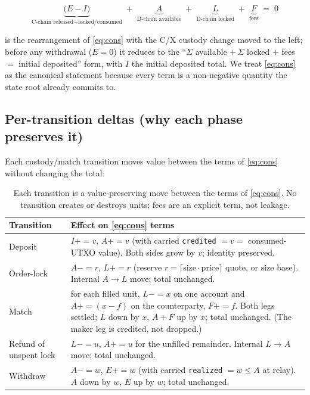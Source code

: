 \[
\underbrace{\big(E - I\big)}_{\text{C-chain released} - \text{locked/consumed}}
\;+\; \underbrace{A}_{\text{D-chain available}}
\;+\; \underbrace{L}_{\text{D-chain locked}}
\;+\; \underbrace{F}_{\text{fees}} \;=\; 0
\]

is the rearrangement of \eqref{eq:cons} with the C/X custody change
moved to the left; before any withdrawal ($E = 0$) it reduces to the
``$\Sigma$ available $+\,\Sigma$ locked $+$ fees $=$ initial deposited''
form, with $I$ the initial deposited total. We treat \eqref{eq:cons} as
the canonical statement because every term is a non-negative quantity
the state root already commits to.

\subsection{Per-transition deltas (why each phase preserves it)}

Each custody/match transition moves value between the terms of
\eqref{eq:cons} without changing the total:

\begin{table}[h]
\centering
\small
\begin{tabular}{@{}lp{8.5cm}@{}}
\toprule
\textbf{Transition} & \textbf{Effect on \eqref{eq:cons} terms} \\
\midrule
Deposit & $I \mathbin{+}= v$, $A \mathbin{+}= v$ (with carried
  \texttt{credited} $= v =$ consumed-UTXO value). Both sides grow by
  $v$; identity preserved. \\
Order-lock & $A \mathbin{-}= r$, $L \mathbin{+}= r$ (reserve $r =
  \lceil \mathrm{size}\cdot\mathrm{price}\rceil$ quote, or $\mathrm{size}$
  base). Internal $A\!\to\!L$ move; total unchanged. \\
Match & for each filled unit, $L \mathbin{-}= x$ on one account and
  $A \mathbin{+}= (x-f)$ on the counterparty, $F \mathbin{+}= f$. Both
  legs settled; $L$ down by $x$, $A{+}F$ up by $x$; total unchanged.
  (The maker leg is credited, not dropped.) \\
Refund of unspent lock & $L \mathbin{-}= u$, $A \mathbin{+}= u$ for the
  unfilled remainder. Internal $L\!\to\!A$ move; total unchanged. \\
Withdraw & $A \mathbin{-}= w$, $E \mathbin{+}= w$ (with carried
  \texttt{realized} $= w \le A$ at relay). $A$ down by $w$, $E$ up by
  $w$; total unchanged. \\
\bottomrule
\end{tabular}
\caption{Each transition is a value-preserving move between the terms of
\eqref{eq:cons}. No transition creates or destroys units; fees are an
explicit term, not leakage.}
\label{tab:deltas}
\end{table}

